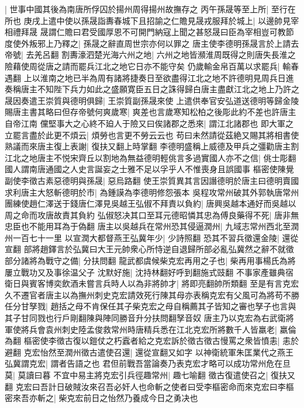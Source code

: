 |{
	世事中國其後為南唐所俘囚於揚州周得揚州故撫存之}
丙午孫晟等至上所|{
	至行在所也}
庚戌上遣中使以孫晟詣夀春城下且招諭之仁贍見晟戎服拜於城上|{
	以邊帥見宰相禮拜晟}
晟謂仁贍曰君受國厚恩不可開門納寇上聞之甚怒晟曰臣為宰相豈可教節度使外叛邪上乃釋之|{
	孫晟之辭直周世宗亦何以罪之}
唐主使李德明孫晟言於上請去帝號|{
	去羌呂翻}
割夀濠泗楚光海六州之地|{
	六州之地皆瀕淮周既得之則唐失長淮之險藉使周從唐之請而罷兵江北之地它日亦不能守矣}
仍歲輸金帛百萬以求罷兵|{
	輸春遇翻}
上以淮南之地已半為周有諸將捷奏日至欲盡得江北之地不許德明見周兵日進奏稱唐主不知陛下兵力如此之盛願寛臣五日之誅得歸白唐主盡獻江北之地上乃許之晟因奏遣王崇質與德明俱歸|{
	王崇質副孫晟來使}
上遣供奉官安弘道送德明等歸金陵賜唐主書其略曰但存帝號何爽歲寒|{
	爽差也言歲寒知松柏之後彫此約不差也許唐主自帝江南}
儻堅事大之心終不廹人于險又曰俟諸郡之悉來|{
	謂江北諸郡也}
即大軍之立罷言盡於此更不煩云|{
	煩勞也言更不勞云云也}
苟曰未然請從茲絶又賜其將相書使熟議而來唐主復上表謝|{
	復扶又翻上時掌翻}
李德明盛稱上威德及甲兵之彊勸唐主割江北之地唐主不悦宋齊丘以割地為無益德明輕佻言多過實國人亦不之信|{
	佻士彫翻國人謂南唐通國之人史言誕妄之士雅不足以孚乎人不惟喪身且誤國事}
樞密使陳覺副使李徵古素惡德明與孫晟|{
	惡烏路翻}
使王崇質異其言因譖德明於唐主曰德明賣國求利唐主大怒斬德明於市|{
	為鍾謨為李德明修怨張本}
吳程攻常州破其外郭執唐常州團練使趙仁澤送于錢唐仁澤見吳越王弘俶不拜責以負約|{
	唐興吳越本通好而吳越以周之命而攻唐故責其負約}
弘俶怒决其口至耳元德昭憐其忠為傅良藥得不死|{
	唐非無忠臣也不能用耳為于偽翻}
唐主以吳越兵在常州恐其侵逼潤州|{
	九域志常州西北至潤州一百七十一里}
以宣潤大都督燕王弘冀年少|{
	少詩照翻}
恐其不習兵徵還金陵|{
	還從宣翻}
部將趙鐸言於弘冀曰大王元帥衆心所恃逆自退歸所部必亂弘冀然之辭不就徵部分諸將為戰守之備|{
	分扶問翻}
龍武都虞候柴克宏再用之子也|{
	柴再用事楊氏為將屢立戰功又及事徐温父子}
沈默好施|{
	沈持林翻好呼到翻施式豉翻}
不事家產雖典宿衛日與賓客博奕飲酒未嘗言兵時人以為非將帥才|{
	將即亮翻帥所類翻}
至是有言克宏久不遷官者唐主以為撫州刺史克宏請效死行陳其母亦表稱克宏有父風可為將苟不勝任分甘孥戮|{
	趙括之母不肯保任其子柴克宏之母自稱薦其子皆知之審也孥子也言與其子甘同戮也行戶剛翻陳與陣同勝音升分扶問翻孥音奴}
唐主乃以克宏為右武衛將軍使將兵會袁州刺史陸孟俊救常州時唐精兵悉在江北克宏所將數千人皆羸老|{
	羸倫為翻}
樞密使李徵古復以鎧仗之朽蠧者給之克宏訴於徵古徵古慢罵之衆皆憤恚|{
	恚於避翻}
克宏怡然至潤州徵古遣使召還|{
	還從宣翻又如字}
以神衛統軍朱匡業代之燕王弘冀謂克宏|{
	謂者告語之也}
君但前戰吾當論奏乃表克宏才略可以成功常州危在旦莫|{
	莫讀曰暮}
不宜中易主將克宏引兵徑趣常州|{
	趣七喻翻}
徵古復遣使召之|{
	復扶又翻}
克宏曰吾計日破賊汝來召吾必奸人也命斬之使者曰受李樞密命而來克宏曰李樞密來吾亦斬之|{
	柴克宏前日之怡然乃養成今日之勇决也}

